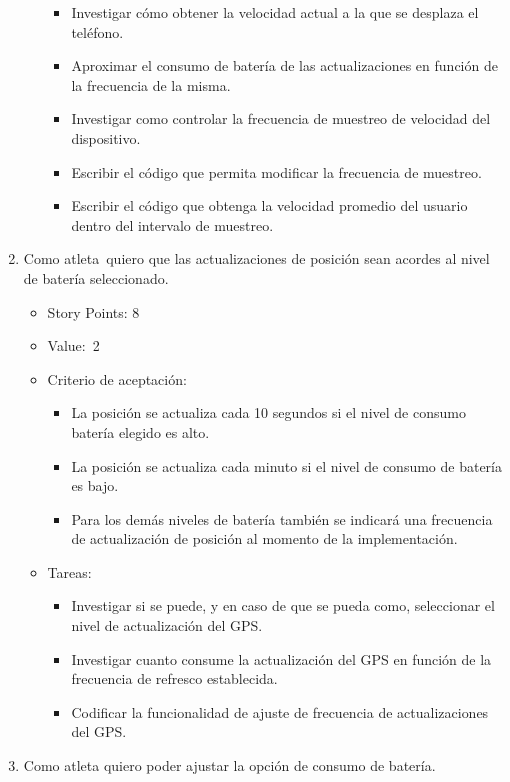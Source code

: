 \begin{enumerate}
\begin{itemize}
    \begin{itemize}
    \item
      Investigar cómo obtener la velocidad actual a la que se desplaza
      el teléfono.
    \item
      Aproximar el consumo de batería de las actualizaciones en función
      de la frecuencia de la misma.
    \item
      Investigar como controlar la frecuencia de muestreo de velocidad
      del dispositivo.
    \item
      Escribir el código que permita modificar la frecuencia de
      muestreo.
    \item
      Escribir el código que obtenga la velocidad promedio del usuario
      dentro del intervalo de muestreo.
    \end{itemize}
  \end{itemize}
\item
  Como atleta~quiero que las actualizaciones de posición sean acordes al
  nivel de batería seleccionado.

  \begin{itemize}
  \item
    Story Points: 8
  \item
    Value:~2
  \item
    Criterio de aceptación:

    \begin{itemize}
    \itemsep1pt\parskip0pt
    \item
      La posición se actualiza cada 10 segundos si el nivel de consumo
      batería elegido es alto.
    \item
      La posición se actualiza cada minuto si el nivel de consumo de
      batería es bajo.
    \item
      Para los demás niveles de batería también se indicará una
      frecuencia de actualización de posición al momento de la
      implementación.
    \end{itemize}
  \item
    Tareas:

    \begin{itemize}
    \itemsep1pt\parskip0pt
    \item
      Investigar si se puede, y en caso de que se pueda como,
      seleccionar el nivel de actualización del GPS.
    \item
      Investigar cuanto consume la actualización del GPS en función de
      la frecuencia de refresco establecida.
    \item
      Codificar la funcionalidad de ajuste de frecuencia de
      actualizaciones del GPS.
    \end{itemize}
  \end{itemize}
\item
  Como atleta quiero poder ajustar la opción de consumo de batería.


\end{enumerate}
